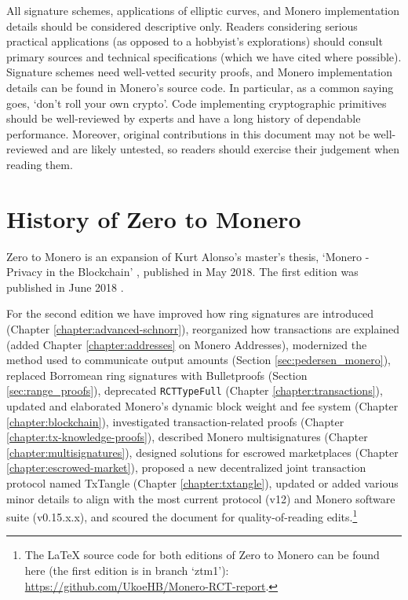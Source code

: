 All signature schemes, applications of elliptic curves, and Monero implementation details should be considered descriptive only. Readers considering serious practical applications (as opposed to a hobbyist's explorations) should consult primary sources and technical specifications (which we have cited where possible). Signature schemes need well-vetted security proofs, and Monero implementation details can be found in Monero's source code. In particular, as a common saying goes, `don't roll your own crypto'. Code implementing cryptographic primitives should be well-reviewed by experts and have a long history of dependable performance. Moreover, original contributions in this document may not be well-reviewed and are likely untested, so readers should exercise their judgement when reading them.



\section{History of Zero to Monero}

Zero to Monero is an expansion of Kurt Alonso's master's thesis, `Monero - Privacy in the Blockchain' \cite{kurt-original}, published in May 2018. The first edition was published in June 2018 \cite{ztm-1}.

For the second edition we have improved how ring signatures are introduced (Chapter \ref{chapter:advanced-schnorr}), reorganized how transactions are explained (added Chapter \ref{chapter:addresses} on Monero Addresses), modernized the method used to communicate output amounts (Section \ref{sec:pedersen_monero}), replaced Borromean ring signatures with Bulletproofs (Section \ref{sec:range_proofs}), deprecated {\tt RCTTypeFull} (Chapter \ref{chapter:transactions}), updated and elaborated Monero's dynamic block weight and fee system (Chapter \ref{chapter:blockchain}), investigated transaction-related proofs (Chapter \ref{chapter:tx-knowledge-proofs}), described Monero multisignatures (Chapter \ref{chapter:multisignatures}), designed solutions for escrowed marketplaces (Chapter \ref{chapter:escrowed-market}), proposed a new decentralized joint transaction protocol named TxTangle (Chapter \ref{chapter:txtangle}), updated or added various minor details to align with the most current protocol (v12) and Monero software suite (v0.15.x.x), and scoured the document for quality-of-reading edits.\footnote{The \LaTeX{} source code for both editions of Zero to Monero can be found here (the first edition is in branch `ztm1'): \url{https://github.com/UkoeHB/Monero-RCT-report}.}



